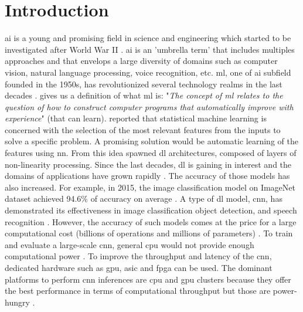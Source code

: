 \chapter{Introduction} \label{chap:intr}
%
\acrfull{ai} is a young and promising field in science and engineering which started to be investigated after World War II \cite{russell_artificial_2009}. \acrshort{ai} is an 'umbrella term' that includes multiples approaches and that envelops a large diversity of domains such as computer vision, natural language processing, voice recognition, etc.
\acrfull{ml}, one of \acrshort{ai} subfield founded in the 1950s, has revolutionized several technology realms in the last decades \cite{alom_history_2018}. \textcite{mitchell_machine_1997} gives us a definition of what \acrshort{ml} is: "\textit{The concept of \acrshort{ml} relates to the question of how to construct computer programs that automatically improve with experience}" (that can learn). \newline \newline
%
\textcite{arnold_introduction_2011} reported that statistical machine learning is concerned with the selection of the most relevant features from the inputs to solve a specific problem. A promising solution would be automatic learning of the features using \acrfull{nn}. From this idea spawned \acrfull{dl} architectures, composed of layers of non-linearity processing. Since the last decades, \acrshort{dl} is gaining in interest and the domains of applications have grown rapidly \cite{wason_deep_2018}. The accuracy of those models has also increased. For example, in 2015, the image classification model on ImageNet dataset achieved 94.6\% of accuracy on average \cite{russakovsky_imagenet_2015}.\newline \newline
%
A type of \acrshort{dl} model, \acrfull{cnn}, has demonstrated its effectiveness in image classiﬁcation object detection, and speech recognition \cite{shawahna_fpga-based_2019}. However, the accuracy of such models comes at the price for a large computational cost (billions of operations and millions of parameters) \cite{szegedy_going_2014}. To train and evaluate a large-scale \acrshort{cnn}, general \acrfull{cpu} would not provide enough computational power \cite{liu_fpga-based_2019}. To improve the throughput and latency of the \acrshort{cnn}, dedicated hardware such as \acrfull{gpu}, \acrfull{asic} and \acrfull{fpga} can be used. The dominant platforms to perform \acrshort{cnn} inferences are \acrshort{cpu} and \acrshort{gpu} clusters because they offer the best performance in terms of computational throughput but those are power-hungry \cite{liu_uniform_2019}.
